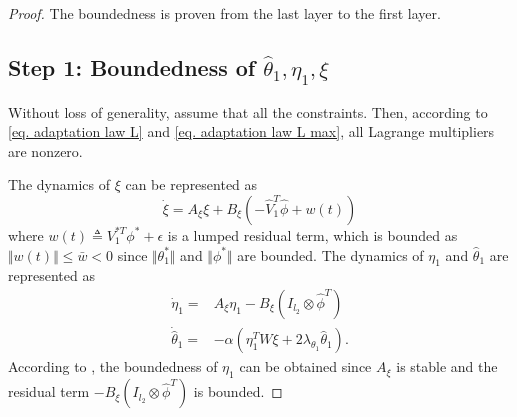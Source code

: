 \documentclass[letterpaper, 10 pt, conference]{ieeeconf}  %
\begin{document}
\begin{proof}

The boundedness is proven from the last layer to the first layer.

\subsection*{Step 1: Boundedness of $\hat\theta_1,\eta_1,\xi$}

\color{black}
Without loss of generality, assume that all the constraints. Then, according to \eqref{eq. adaptation law L} and \eqref{eq. adaptation law L max}, all Lagrange multipliers are nonzero.
\color{black}

The dynamics of $\xi$ can be represented as
\begin{equation*}    
    \dot \xi = A_\xi\xi +B_\xi
    (
        -\hat V_1^T \hat\phi+w(t)
    )
\end{equation*}
where $w(t)\triangleq V_1^{*T}\phi^*+\epsilon$ is a lumped residual term, which is bounded as $\Vert w(t)\Vert\le \bar w< 0$ since $\Vert\theta_1^*\Vert$ and $\Vert\phi^*\Vert$ are bounded.
The dynamics of $\eta_1$ and $\hat\theta_1$ are represented as
\begin{equation*}
    \begin{aligned}
        \dot\eta_1 =
        & 
        A_\xi \eta_1 -B_\xi (I_{l_{2}}\otimes \hat\phi^T)
        \\
        \dot{\hat\theta}_1 =
        & -\alpha 
        (
            \eta_1^TW\xi+2\lambda_{\theta_1} \hat\theta_1
        ).
    \end{aligned} 
\end{equation*}
According to \cite[Chap.~4 T.~1.9]{RN32}, the boundedness of $\eta_1$ can be obtained since $A_\xi$ is stable and the residual term $-B_\xi (I_{l_{2}}\otimes \hat\phi^T)$ is bounded.


\end{proof}
\end{document}
